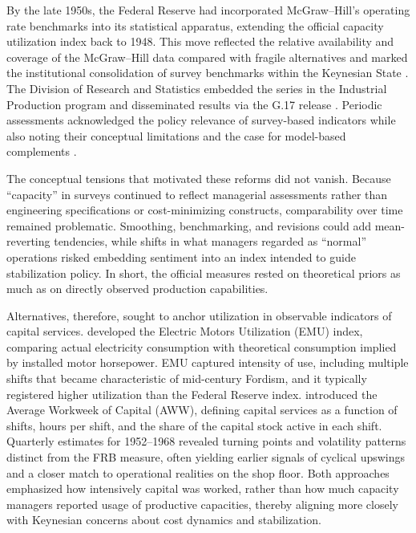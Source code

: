 \documentclass[11pt]{article}
\begin{document}
By the late 1950s, the Federal Reserve had incorporated McGraw--Hill's operating rate benchmarks into its statistical apparatus, extending the official capacity utilization index back to 1948. This move reflected the relative availability and coverage of the McGraw--Hill data compared with fragile alternatives and marked the institutional consolidation of survey benchmarks within the Keynesian State \citep{jessop2002}. The Division of Research and Statistics embedded the series in the Industrial Production program and disseminated results via the G.17 release \citep{bogfrs2017}. Periodic assessments acknowledged the policy relevance of survey-based indicators while also noting their conceptual limitations and the case for model-based complements \citep{usgao1996}.

The conceptual tensions that motivated these reforms did not vanish. Because ``capacity'' in surveys continued to reflect managerial assessments rather than engineering specifications or cost-minimizing constructs, comparability over time remained problematic. Smoothing, benchmarking, and revisions could add mean-reverting tendencies, while shifts in what managers regarded as ``normal'' operations risked embedding sentiment into an index intended to guide stabilization policy. In short, the official measures rested on theoretical priors as much as on directly observed production capabilities.

Alternatives, therefore, sought to anchor utilization in observable indicators of capital services. \citet{foss1963} developed the Electric Motors Utilization (EMU) index, comparing actual electricity consumption with theoretical consumption implied by installed motor horsepower. EMU captured intensity of use, including multiple shifts that became characteristic of mid-century Fordism, and it typically registered higher utilization than the Federal Reserve index. \citet{taubmangottschalk1971} introduced the Average Workweek of Capital (AWW), defining capital services as a function of shifts, hours per shift, and the share of the capital stock active in each shift. Quarterly estimates for 1952--1968 revealed turning points and volatility patterns distinct from the FRB measure, often yielding earlier signals of cyclical upswings and a closer match to operational realities on the shop floor. Both approaches emphasized how intensively capital was worked, rather than how much capacity managers reported usage of productive capacities, thereby aligning more closely with Keynesian concerns about cost dynamics and stabilization.
\end{document}
